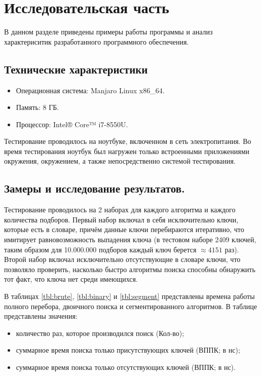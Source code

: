 \chapter{Исследовательская часть}

В данном разделе приведены примеры работы программы и анализ характериситик разработанного программного обеспечения.

\section{Технические характеристики}

\begin{itemize}
    \item Операционная система: Manjaro \cite{manjaro} Linux \cite{linux} x86\_64.
    \item Память: 8 ГБ.
    \item Процессор: Intel® Core™ i7-8550U\cite{intel}.
\end{itemize}

Тестирование проводилось на ноутбуке, включенном в сеть электропитания. Во время тестирования ноутбук был нагружен только встроенными приложениями окружения, окружением, а также непосредственно системой тестирования.

\section{Замеры и исследование результатов.}

Тестирование проводилось на 2 наборах для каждого алгоритма и каждого количества подборов. Первый набор включал в себя исключительно ключи, которые есть в словаре, причём данные ключи перебираются итеративно, что имитирует равновозможность выпадения ключа (в тестовом наборе 2409 ключей, таким образом для 10.000.000 подборов каждый ключ берется $\approx 4151$ раз). Второй набор включал исключительно отсутствующие в словаре ключи, что позволяло проверить, насколько быстро алгоритмы поиска способны обнаружить тот факт, что ключа нет среди имеющихся.

В таблицах \ref{tbl:brute}, \ref{tbl:binary} и \ref{tbl:segment} представлены времена работы полного перебора, двоичного поиска и сегментированного алгоритмов. В таблице представлены значения:
\begin{itemize}
    \item количество раз, которое производился поиск (Кол-во);
    \item суммарное время поиска только присутствующих ключей (ВППК; в нс);
    \item суммарное время поиска только отсутствующих ключей (ВППК; в нс).
\end{itemize}

